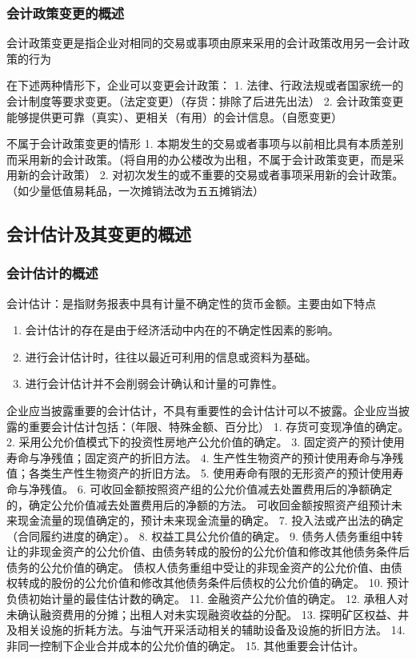 \documentclass[UTF8,12pt]{ctexart}
\numberwithin{equation}{section} %
\numberwithin{figure}{section}
\numberwithin{table}{section}
\begin{document}
	\subsubsection{会计政策变更的概述}
	会计政策变更是指企业对相同的交易或事项由原来采用的会计政策改用另一会计政策的行为
	
	在下述两种情形下，企业可以变更会计政策：
	1.	法律、行政法规或者国家统一的会计制度等要求变更。（法定变更）（存货：排除了后进先出法）
	2.	会计政策变更能够提供更可靠（真实）、更相关（有用）的会计信息。（自愿变更）
	
	不属于会计政策变更的情形
	1.	本期发生的交易或者事项与以前相比具有本质差别而采用新的会计政策。（将自用的办公楼改为出租，不属于会计政策变更，而是采用新的会计政策）
	2.	对初次发生的或不重要的交易或者事项采用新的会计政策。（如少量低值易耗品，一次摊销法改为五五摊销法）
	
	
	\subsection{会计估计及其变更的概述}
	\subsubsection{会计估计的概述}
	会计估计：是指财务报表中具有计量不确定性的货币金额。主要由如下特点
	\begin{enumerate}
		\item 会计估计的存在是由于经济活动中内在的不确定性因素的影响。
		
		\item 进行会计估计时，往往以最近可利用的信息或资料为基础。
		
		\item 进行会计估计并不会削弱会计确认和计量的可靠性。
	\end{enumerate}
	
	企业应当披露重要的会计估计，不具有重要性的会计估计可以不披露。企业应当披露的重要会计估计包括：（年限、特殊金额、百分比）
	1.	存货可变现净值的确定。
	2.	采用公允价值模式下的投资性房地产公允价值的确定。
	3.	固定资产的预计使用寿命与净残值；固定资产的折旧方法。
	4.	生产性生物资产的预计使用寿命与净残值；各类生产性生物资产的折旧方法。
	5.	使用寿命有限的无形资产的预计使用寿命与净残值。
	6.	可收回金额按照资产组的公允价值减去处置费用后的净额确定的，确定公允价值减去处置费用后的净额的方法。
	可收回金额按照资产组预计未来现金流量的现值确定的，预计未来现金流量的确定。
	7.	投入法或产出法的确定（合同履约进度的确定）。
	8.	权益工具公允价值的确定。
	9.	债务人债务重组中转让的非现金资产的公允价值、由债务转成的股份的公允价值和修改其他债务条件后债务的公允价值的确定。
	债权人债务重组中受让的非现金资产的公允价值、由债权转成的股份的公允价值和修改其他债务条件后债权的公允价值的确定。
	10.	预计负债初始计量的最佳估计数的确定。
	11.	金融资产公允价值的确定。
	12.	承租人对未确认融资费用的分摊；出租人对未实现融资收益的分配。
	13.	探明矿区权益、井及相关设施的折耗方法。与油气开采活动相关的辅助设备及设施的折旧方法。
	14.	非同一控制下企业合并成本的公允价值的确定。
	15.	其他重要会计估计。
	
\end{document}
